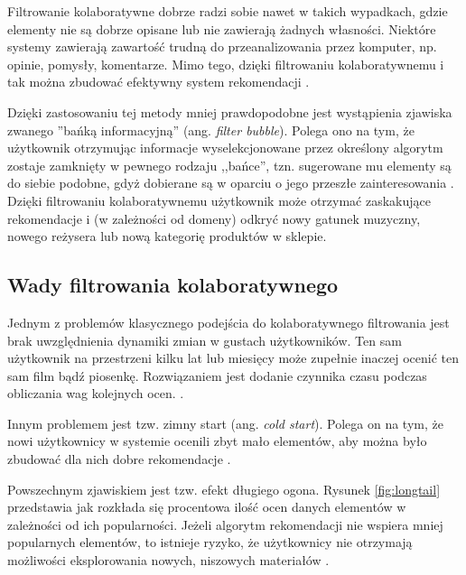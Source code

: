 \documentclass[twoside]{iisthesis}
\begin{document}
	 Filtrowanie kolaboratywne dobrze radzi sobie nawet w takich wypadkach, gdzie elementy nie są dobrze opisane lub nie zawierają żadnych własności. Niektóre systemy zawierają zawartość trudną do przeanalizowania przez komputer, np. opinie, pomysły, komentarze. Mimo tego, dzięki filtrowaniu kolaboratywnemu i tak można zbudować efektywny system rekomendacji \cite{melville2002content}.
	 
	 Dzięki zastosowaniu tej metody mniej prawdopodobne jest wystąpienia zjawiska zwanego ''bańką informacyjną'' (ang. \textit{filter bubble}). Polega ono na tym, że użytkownik otrzymując informacje wyselekcjonowane przez określony algorytm zostaje zamknięty w pewnego rodzaju ,,bańce'', tzn. sugerowane mu elementy są do siebie podobne, gdyż dobierane są w oparciu o jego przeszłe zainteresowania \cite{pariser2011filter}. Dzięki filtrowaniu kolaboratywnemu użytkownik może otrzymać zaskakujące rekomendacje i (w zależności od domeny) odkryć nowy gatunek muzyczny, nowego reżysera lub nową kategorię produktów w sklepie.	 

	 \subsection{Wady filtrowania kolaboratywnego}
	 
	 Jednym z problemów klasycznego podejścia do kolaboratywnego filtrowania jest brak uwzględnienia dynamiki zmian w gustach użytkowników. Ten sam użytkownik na przestrzeni kilku lat lub miesięcy może zupełnie inaczej ocenić ten sam film bądź piosenkę. Rozwiązaniem jest dodanie czynnika czasu podczas obliczania wag kolejnych ocen. \cite{id:NewRecommentationAlgoritmBasedOnSocialNetwork,id:NextSongRecommendationWithTemporalDynamics,koren2009matrix}.
	 
	 Innym problemem jest tzw. zimny start (ang. \textit{cold start}). Polega on na tym, że nowi użytkownicy w systemie ocenili zbyt mało elementów, aby można było zbudować dla nich dobre rekomendacje \cite{id:RubensRecSysHB2010,id:zhang2015hybrid}.
	 
	 Powszechnym zjawiskiem jest tzw. efekt długiego ogona. Rysunek \ref{fig:longtail} przedstawia jak rozkłada się procentowa ilość ocen danych elementów w zależności od ich popularności. Jeżeli algorytm rekomendacji nie wspiera mniej popularnych elementów, to istnieje ryzyko, że użytkownicy nie otrzymają możliwości eksplorowania nowych, niszowych materiałów \cite{id:celma2010music,id:RubensRecSysHB2010}.
	 
\end{document}
